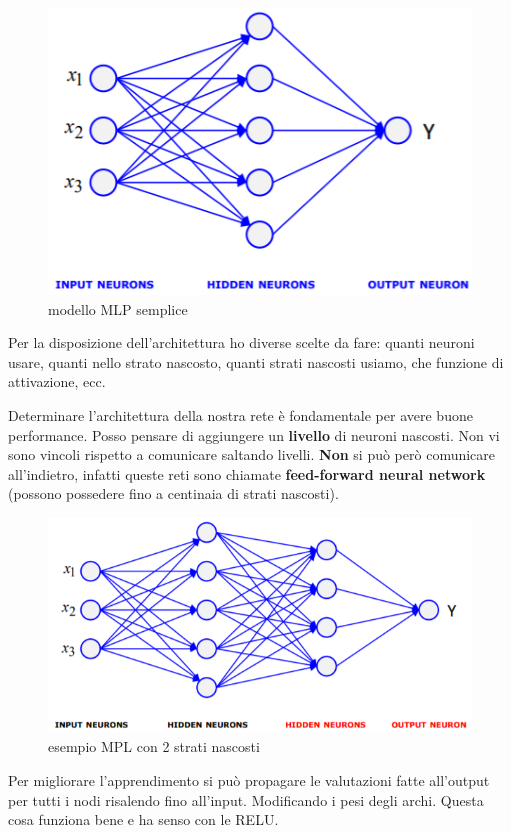 \begin{figure}[H]
	\centering
	\includegraphics[height=0.5 \linewidth]{classification/pict/mlp_struct.png}
	\caption{modello MLP semplice}
\end{figure}

Per la disposizione dell'architettura ho diverse scelte da fare: quanti neuroni usare, quanti nello strato nascosto, quanti strati nascosti usiamo, che funzione di attivazione, ecc.

Determinare l'architettura della nostra rete è fondamentale per avere buone performance. Posso pensare di aggiungere un \textbf{livello} di neuroni nascosti. Non vi sono vincoli rispetto a comunicare saltando livelli. \textbf{Non} si pu\`o per\`o comunicare all'indietro, infatti queste reti sono chiamate \textbf{feed-forward neural network} (possono possedere fino a centinaia di strati nascosti).

\begin{figure}[H]
	\centering
	\includegraphics[height=0.5 \linewidth]{classification/pict/mlp_esempio.png}
	\caption{esempio MPL con 2 strati nascosti}
\end{figure}

Per migliorare l'apprendimento si pu\`o propagare le valutazioni fatte all'output per tutti i nodi risalendo fino all'input. Modificando i pesi degli archi. Questa cosa funziona bene e ha senso con le RELU.

